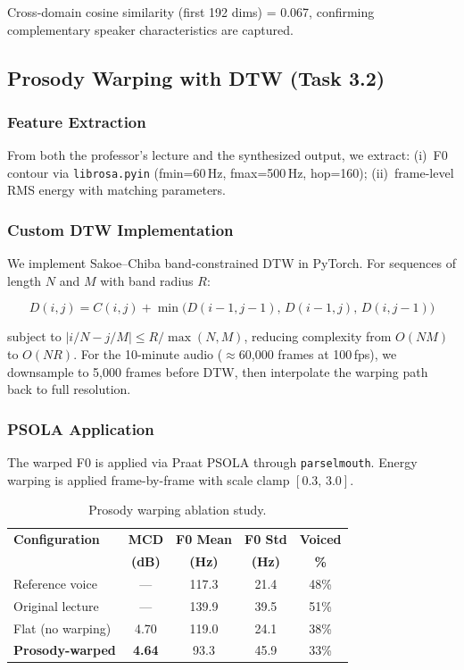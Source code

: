 \documentclass[11pt]{article}
\begin{document}
Cross-domain cosine similarity (first 192 dims) = 0.067, confirming
complementary speaker characteristics are captured.

\subsection{Prosody Warping with DTW (Task 3.2)}

\subsubsection{Feature Extraction}

From both the professor's lecture and the synthesized output, we extract:
(i)~F0 contour via \texttt{librosa.pyin} (fmin=60\,Hz, fmax=500\,Hz,
hop=160); (ii)~frame-level RMS energy with matching parameters.

\subsubsection{Custom DTW Implementation}

We implement Sakoe--Chiba band-constrained DTW in PyTorch. For sequences
of length $N$ and $M$ with band radius $R$:

\begin{equation}
  D(i,j) = C(i,j) + \min\bigl(D(i-1,j-1),\,D(i-1,j),\,D(i,j-1)\bigr)
\end{equation}

subject to $|i/N - j/M| \le R/\max(N,M)$, reducing complexity from
$O(NM)$ to $O(NR)$. For the 10-minute audio ($\approx$60,000 frames at
100\,fps), we downsample to 5,000 frames before DTW, then interpolate the
warping path back to full resolution.

\subsubsection{PSOLA Application}

The warped F0 is applied via Praat PSOLA through \texttt{parselmouth}.
Energy warping is applied frame-by-frame with scale clamp $[0.3,\,3.0]$.

\begin{table}[h]
\centering
\caption{Prosody warping ablation study.}
\label{tab:ablation}
\small
\begin{tabular}{lcccc}
\toprule
\textbf{Configuration} & \textbf{MCD} & \textbf{F0 Mean} & \textbf{F0 Std} & \textbf{Voiced}\\
                       & \textbf{(dB)} & \textbf{(Hz)} & \textbf{(Hz)} & \textbf{\%}\\
\midrule
Reference voice         & ---  & 117.3 & 21.4 & 48\%\\
Original lecture        & ---  & 139.9 & 39.5 & 51\%\\
Flat (no warping)       & 4.70 & 119.0 & 24.1 & 38\%\\
\textbf{Prosody-warped} & \textbf{4.64} & 93.3 & 45.9 & 33\%\\
\bottomrule
\end{tabular}
\end{table}
\end{document}
